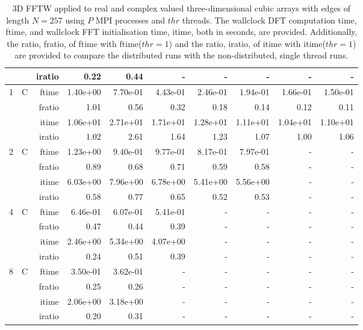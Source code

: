 \documentclass[a4paper]{article}
\begin{document}
\begin{table}[htbp]
\begin{center}
\begin{small}
\begin{tabular}{|r|r|r|r|r|r|r|r|r|r|}
          &      & iratio & 0.22 & 0.44 &     -     &     -     &     -     &     -     &     -     \\ \hline  \hline
     1 & C & ftime & 1.40e+00 & 7.70e-01 & 4.43e-01 & 2.46e-01 & 1.94e-01 & 1.66e-01 & 1.50e-01 \\   
          &      & fratio & 1.01 & 0.56 & 0.32 & 0.18 & 0.14 & 0.12 & 0.11 \\   
          &      & itime & 1.06e+01 & 2.71e+01 & 1.71e+01 & 1.28e+01 & 1.11e+01 & 1.04e+01 & 1.10e+01 \\   
          &      & iratio & 1.02 & 2.61 & 1.64 & 1.23 & 1.07 & 1.00 & 1.06 \\ \hline 
     2 & C & ftime & 1.23e+00 & 9.40e-01 & 9.77e-01 & 8.17e-01 & 7.97e-01 &     -     &     -     \\   
          &      & fratio & 0.89 & 0.68 & 0.71 & 0.59 & 0.58 &     -     &     -     \\   
          &      & itime & 6.03e+00 & 7.96e+00 & 6.78e+00 & 5.41e+00 & 5.56e+00 &     -     &     -     \\   
          &      & iratio & 0.58 & 0.77 & 0.65 & 0.52 & 0.53 &     -     &     -     \\ \hline 
     4 & C & ftime & 6.46e-01 & 6.07e-01 & 5.41e-01 &     -     &     -     &     -     &     -     \\   
          &      & fratio & 0.47 & 0.44 & 0.39 &     -     &     -     &     -     &     -     \\   
          &      & itime & 2.46e+00 & 5.34e+00 & 4.07e+00 &     -     &     -     &     -     &     -     \\   
          &      & iratio & 0.24 & 0.51 & 0.39 &     -     &     -     &     -     &     -     \\ \hline 
     8 & C & ftime & 3.50e-01 & 3.62e-01 &     -     &     -     &     -     &     -     &     -     \\   
          &      & fratio & 0.25 & 0.26 &     -     &     -     &     -     &     -     &     -     \\   
          &      & itime & 2.06e+00 & 3.18e+00 &     -     &     -     &     -     &     -     &     -     \\   
          &      & iratio & 0.20 & 0.31 &     -     &     -     &     -     &     -     &     -     \\ \hline 
\end{tabular}
\caption{3D FFTW applied to real and complex valued three-dimensional cubic arrays with edges of length $N=257$ using $P$ MPI processes and $thr$ threads. The wallclock DFT computation time, ftime, and wallclock FFT initialisation time, itime, both in seconds, are provided. Additionally, the ratio, fratio, of ftime  with ftime($thr=1$) and the ratio, iratio, of itime  with itime($thr=1$) are provided to compare the distributed runs with the non-distributed, single thread runs.  }\label{TblFFTW3d257}
\end{small}
\end{center}
\end{table}
\end{document}
